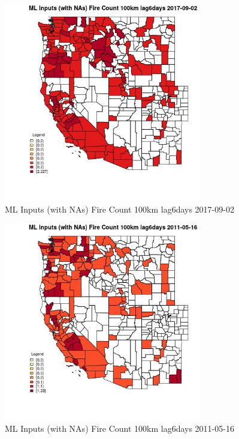 \begin{figure} 
\centering  
\includegraphics[width=0.77\textwidth]{Code_Outputs/Report_ML_input_PM25_Step4_part_e_de_duplicated_aves_compiled_2019-05-21wNAs_CountyFire_Count_100km_lag6daysMean2017-09-02.jpg} 
\caption{\label{fig:Report_ML_input_PM25_Step4_part_e_de_duplicated_aves_compiled_2019-05-21wNAsCountyFire_Count_100km_lag6daysMean2017-09-02}ML Inputs (with NAs) Fire Count 100km lag6days 2017-09-02} 
\end{figure} 
 

\begin{figure} 
\centering  
\includegraphics[width=0.77\textwidth]{Code_Outputs/Report_ML_input_PM25_Step4_part_e_de_duplicated_aves_compiled_2019-05-21wNAs_CountyFire_Count_100km_lag6daysMean2011-05-16.jpg} 
\caption{\label{fig:Report_ML_input_PM25_Step4_part_e_de_duplicated_aves_compiled_2019-05-21wNAsCountyFire_Count_100km_lag6daysMean2011-05-16}ML Inputs (with NAs) Fire Count 100km lag6days 2011-05-16} 
\end{figure} 
 

